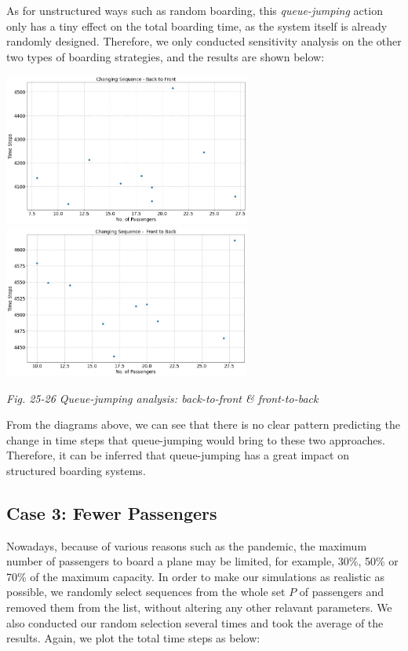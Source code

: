 \documentclass{article}
\theoremstyle{definition}
\theoremstyle{remark}
\numberwithin{equation}{section}
\begin{document}
	As for unstructured ways such as random boarding, this \textit{queue-jumping} action only has a tiny effect on the total boarding time, as the system itself is already randomly designed. Therefore, we only conducted sensitivity analysis on the other two types of boarding strategies, and the results are shown below:
	\begin{center}
		\includegraphics[height = 5cm]{changesq btf.jpg}
		\includegraphics[height = 5cm]{changesq ftb.jpg}

		\small\textit{Fig. 25-26 Queue-jumping analysis: back-to-front \& front-to-back}
	\end{center}

	From the diagrams above, we can see that there is no clear pattern predicting the change in time steps that queue-jumping would bring to these two approaches. Therefore, it can be inferred that queue-jumping has a great impact on structured boarding systems.


	\subsection{Case 3: Fewer Passengers}
	Nowadays, because of various reasons such as the pandemic, the maximum number of passengers to board a plane may be limited, for example, 30\%, 50\% or 70\% of the maximum capacity. In order to make our simulations as realistic as possible, we randomly select sequences from the whole set \(P\) of passengers and removed them from the list, without altering any other relavant parameters. We also conducted our random selection several times and took the average of the results. Again, we plot the total time steps as below:
\end{document}

